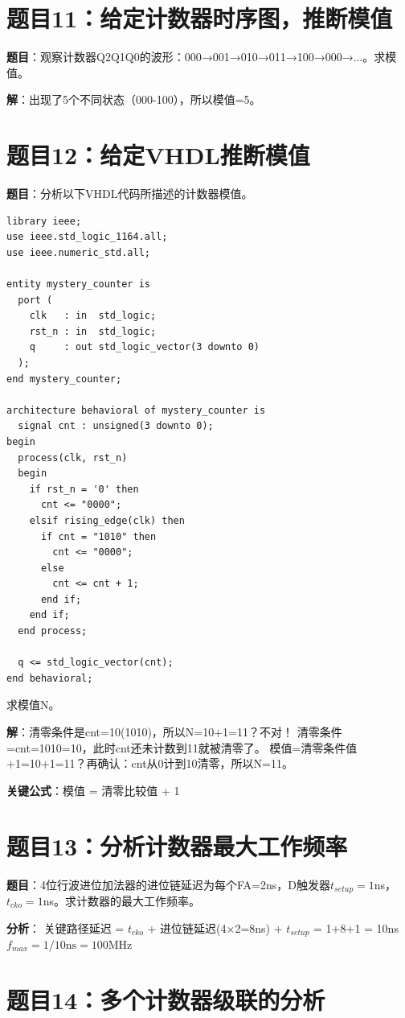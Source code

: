 \section*{题目11：给定计数器时序图，推断模值}

\textbf{题目}：观察计数器Q2Q1Q0的波形：000→001→010→011→100→000→...。求模值。

\textbf{解}：出现了5个不同状态（000-100），所以模值=5。

\section*{题目12：给定VHDL推断模值}

\textbf{题目}：分析以下VHDL代码所描述的计数器模值。
\begin{lstlisting}[caption={推断模值——完整代码}]
library ieee;
use ieee.std_logic_1164.all;
use ieee.numeric_std.all;

entity mystery_counter is
  port (
    clk   : in  std_logic;
    rst_n : in  std_logic;
    q     : out std_logic_vector(3 downto 0)
  );
end mystery_counter;

architecture behavioral of mystery_counter is
  signal cnt : unsigned(3 downto 0);
begin
  process(clk, rst_n)
  begin
    if rst_n = '0' then
      cnt <= "0000";
    elsif rising_edge(clk) then
      if cnt = "1010" then
        cnt <= "0000";
      else
        cnt <= cnt + 1;
      end if;
    end if;
  end process;

  q <= std_logic_vector(cnt);
end behavioral;
\end{lstlisting}
求模值N。

\textbf{解}：清零条件是cnt=10(1010)，所以N=10+1=11？不对！
清零条件=cnt=1010=10，此时cnt还未计数到11就被清零了。
模值=清零条件值+1=10+1=11？再确认：cnt从0计到10清零，所以N=11。

\textbf{关键公式}：模值 = 清零比较值 + 1

\section*{题目13：分析计数器最大工作频率}

\textbf{题目}：4位行波进位加法器的进位链延迟为每个FA=2ns，D触发器$t_{setup}=1$ns，$t_{cko}=1$ns。求计数器的最大工作频率。

\textbf{分析}：
关键路径延迟 = $t_{cko}$ + 进位链延迟(4×2=8ns) + $t_{setup}$ = 1+8+1 = 10ns
$f_{max} = 1/10\text{ns} = 100\text{MHz}$

\section*{题目14：多个计数器级联的分析}

